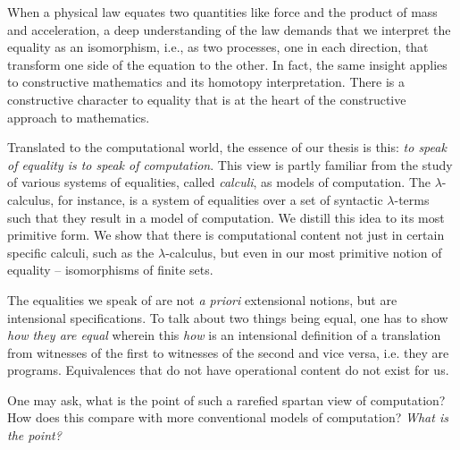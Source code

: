 \documentclass{article}
\newcommand{\lcal}{\ensuremath{\lambda}-calculus}
\begin{document}
When a physical law equates two quantities like force and the product of mass
and acceleration, a deep understanding of the law demands that we interpret
the equality as an isomorphism, i.e., as two processes, one in each
direction, that transform one side of the equation to the other. In fact, the
same insight applies to constructive mathematics and its homotopy
interpretation. There is a constructive character to equality that is at the
heart of the constructive approach to mathematics. 

Translated to the computational world, the essence of our thesis is this:
\emph{to speak of equality is to speak of computation}. This view is partly
familiar from the study of various systems of equalities, called
\emph{calculi}, as models of computation. The \lcal, for instance, is a
system of equalities over a set of syntactic $\lambda$-terms such that they
result in a model of computation. We distill this idea to its most primitive
form. We show that there is computational content not just in certain
specific calculi, such as the \lcal, but even in our most primitive notion of
equality -- isomorphisms of finite sets.

The equalities we speak of are not \emph{a priori} extensional
notions, but are intensional specifications. To talk about two things
being equal, one has to show \emph{how they are equal} wherein this
\emph{how} is an intensional definition of a translation from
witnesses of the first to witnesses of the second and vice versa,
i.e. they are programs. Equivalences that do not have operational
content do not exist for us.

One may ask, what is the point of such a rarefied spartan view of
computation? How does this compare with more conventional models of
computation?  \emph{What is the point?} 
\end{document}
